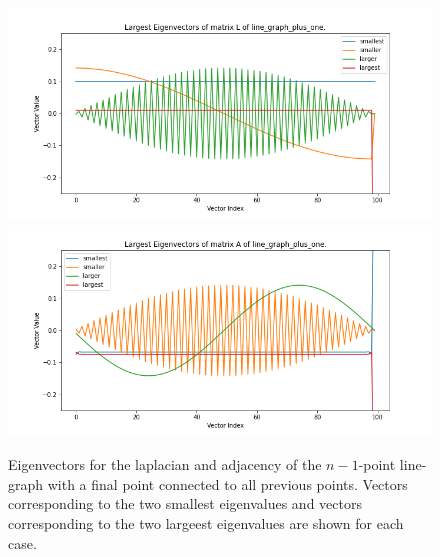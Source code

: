 \documentclass[12pt]{article}
\begin{document}
\begin{enumerate}[label=(\alph*)]
      \begin{figure}[!ht]
        \centering
        \includegraphics[scale=0.3]{figures/eigenvectors_line_graph_plus_one_L.png}
        \includegraphics[scale=0.3]{figures/eigenvectors_line_graph_plus_one_A.png}
        \caption{Eigenvectors for the laplacian and adjacency of the $n-1$-point line-graph with a final point connected to all previous points. Vectors corresponding to the two smallest eigenvalues and vectors corresponding to the two largeest eigenvalues are shown for each case.}
        \label{fig:line_graph_plus_one}
      \end{figure}


\end{enumerate}
\end{document}
